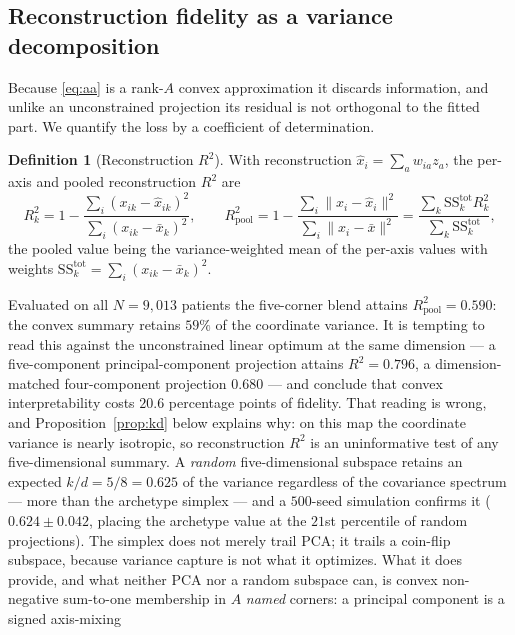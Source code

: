 \documentclass[11pt]{article}
\theoremstyle{plain}
\theoremstyle{definition}
\newtheorem{definition}{Definition}
\begin{document}
\subsection{Reconstruction fidelity as a variance decomposition}
\label{sub:recon}

Because \eqref{eq:aa} is a rank-$A$ convex approximation it discards information, and unlike
an unconstrained projection its residual is not orthogonal to the fitted part. We quantify the
loss by a coefficient of determination.

\begin{definition}[Reconstruction $R^2$]\label{def:r2}
With reconstruction $\hat x_i=\sum_a w_{ia}z_a$, the per-axis and pooled reconstruction
$R^2$ are
\begin{equation}
  R^2_k=1-\frac{\sum_i (x_{ik}-\hat x_{ik})^2}{\sum_i (x_{ik}-\bar x_k)^2},
  \qquad
  R^2_{\mathrm{pool}}=1-\frac{\sum_i\|x_i-\hat x_i\|^2}{\sum_i\|x_i-\bar x\|^2}
  =\frac{\sum_k \mathrm{SS}^{\mathrm{tot}}_k R^2_k}{\sum_k \mathrm{SS}^{\mathrm{tot}}_k},
  \label{eq:r2}
\end{equation}
the pooled value being the variance-weighted mean of the per-axis values with weights
$\mathrm{SS}^{\mathrm{tot}}_k=\sum_i (x_{ik}-\bar x_k)^2$.
\end{definition}
\noindent
Evaluated on all $N=9{,}013$ patients the five-corner blend attains
$R^2_{\mathrm{pool}}=0.590$: the convex summary retains $59\%$ of the coordinate variance. It is
tempting to read this against the unconstrained linear optimum at the same dimension --- a
five-component principal-component projection attains $R^2=0.796$, a dimension-matched
four-component projection $0.680$ --- and conclude that convex interpretability costs
$20.6$ percentage points of fidelity. That reading is wrong, and Proposition~\ref{prop:kd} below
explains why: on this map the coordinate variance is nearly isotropic, so reconstruction $R^2$ is
an uninformative test of any five-dimensional summary. A \emph{random} five-dimensional subspace
retains an expected $k/d=5/8=0.625$ of the variance regardless of the covariance spectrum --- more
than the archetype simplex --- and a $500$-seed simulation confirms it ($0.624\pm0.042$, placing
the archetype value at the $21$st percentile of random projections). The simplex does not merely
trail PCA; it trails a coin-flip subspace, because variance capture is not what it optimizes.
What it does provide, and what neither PCA nor a random subspace can, is convex non-negative
sum-to-one membership in $A$ \emph{named} corners: a principal component is a signed axis-mixing
\end{document}
